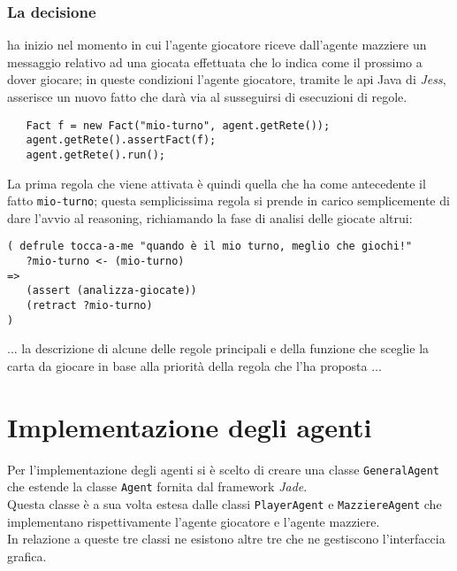 \documentclass[runningheads,a4paper]{llncs}
\begin{document}
\subsubsection{La decisione}


 ha inizio nel momento in cui l'agente giocatore riceve dall'agente mazziere un messaggio relativo ad una giocata effettuata che lo indica come il prossimo a dover giocare; in queste condizioni l'agente giocatore, tramite le api Java di \emph{Jess}, asserisce un nuovo fatto che darà via al susseguirsi di esecuzioni di regole.
\begin{verbatim}
   Fact f = new Fact("mio-turno", agent.getRete());
   agent.getRete().assertFact(f);
   agent.getRete().run();
\end{verbatim}


La prima regola che viene attivata è quindi quella che ha come antecedente il fatto \texttt{mio-turno}; questa semplicissima regola si prende in carico semplicemente di dare l'avvio al reasoning, richiamando la fase di analisi delle giocate altrui:

\begin{verbatim}
( defrule tocca-a-me "quando è il mio turno, meglio che giochi!"
   ?mio-turno <- (mio-turno)
=>
   (assert (analizza-giocate))
   (retract ?mio-turno)
)
\end{verbatim}


... la descrizione di alcune delle regole principali e della funzione che sceglie la carta da giocare in base alla priorità della regola che l'ha proposta ...

\section{Implementazione degli agenti}

Per l'implementazione degli agenti si è scelto di creare una classe \texttt{GeneralAgent} che estende la classe \texttt{Agent} fornita dal framework \emph{Jade}.\\
Questa classe è a sua volta estesa dalle classi \texttt{PlayerAgent} e \texttt{MazziereAgent} che implementano rispettivamente l'agente giocatore e l'agente mazziere.\\
In relazione a queste tre classi ne esistono altre tre che ne gestiscono l'interfaccia grafica. 
\end{document}
